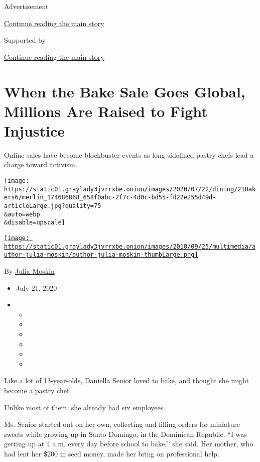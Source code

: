 Advertisement

\protect\hyperlink{after-top}{Continue reading the main story}

Supported by

\protect\hyperlink{after-sponsor}{Continue reading the main story}

\hypertarget{when-the-bake-sale-goes-global-millions-are-raised-to-fight-injustice}{%
\section{When the Bake Sale Goes Global, Millions Are Raised to Fight
Injustice}\label{when-the-bake-sale-goes-global-millions-are-raised-to-fight-injustice}}

Online sales have become blockbuster events as long-sidelined pastry
chefs lead a charge toward activism.

\texttt{[image: https://static01.graylady3jvrrxbe.onion/images/2020/07/22/dining/21Bakers6/merlin\_174686868\_658f0abc-2f7c-4d0c-bd55-fd22e255d49d-articleLarge.jpg?quality=75\\\&auto=webp\\\&disable=upscale]}

\href{https://www.nytimes3xbfgragh.onion/by/julia-moskin}{\texttt{[image: https://static01.graylady3jvrrxbe.onion/images/2018/09/25/multimedia/author-julia-moskin/author-julia-moskin-thumbLarge.png]}}

By \href{https://www.nytimes3xbfgragh.onion/by/julia-moskin}{Julia
Moskin}

\begin{itemize}
\item
  July 21, 2020
\item
  \begin{itemize}
  \item
  \item
  \item
  \item
  \item
  \item
  \end{itemize}
\end{itemize}

Like a lot of 13-year-olds, Daniella Senior loved to bake, and thought
she might become a pastry chef.

Unlike most of them, she already had six employees.

Ms. Senior started out on her own, collecting and filling orders for
miniature sweets while growing up in Santo Domingo, in the Dominican
Republic. ``I was getting up at 4 a.m. every day before school to
bake,'' she said. Her mother, who had lent her \$200 in seed money, made
her bring on professional help.

